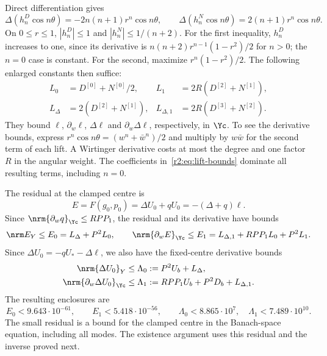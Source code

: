 Direct differentiation gives
\[
 \Delta(h_n^D\cos n\theta)=-2n(n+1)r^n\cos n\theta,
 \qquad
 \Delta(h_n^N\cos n\theta)=2(n+1)r^n\cos n\theta.
\]
On $0\le r\le1$, $|h_n^D|\le1$ and $|h_n^N|\le1/(n+2)$. For the first inequality, $h_n^D$ increases to one, since its derivative is $n(n+2)r^{n-1}(1-r^2)/2$ for $n>0$; the $n=0$ case is constant. For the second, maximize $r^n(1-r^2)/2$. The following enlarged constants then suffice:
\begin{equation}\label{r2:eq:lift-bounds}
 \begin{aligned}
 L_0&=D^{[0]}+N^{[0]}/2,&
 L_1&=2R(D^{[2]}+N^{[1]}),\\
 L_\Delta&=2(D^{[2]}+N^{[1]}),&
 L_{\Delta,1}&=2R(D^{[3]}+N^{[2]}).
 \end{aligned}
\end{equation}
They bound $\ell$, $\partial_w\ell$, $\Delta\ell$ and $\partial_w\Delta\ell$, respectively, in $\Yc$. To see the derivative bounds, express $r^n\cos n\theta=(w^n+\bar w^n)/2$ and multiply by $w\bar w$ for the second term of each lift. A Wirtinger derivative costs at most the degree and one factor $R$ in the angular weight. The coefficients in~\eqref{r2:eq:lift-bounds} dominate all resulting terms, including $n=0$.

The residual at the clamped centre is
\begin{equation}\label{r2:eq:E}
 E=F(g_0,p_0)=\Delta U_0+qU_0=-(\Delta+q)\ell.
\end{equation}
Since $\nrm{\partial_wq}_{\Yc}\le RPP_1$, the residual and its derivative have bounds
\begin{equation}\label{r2:eq:E-bounds}
 \nrm E_Y\le E_0=L_\Delta+P^2L_0,
 \qquad
 \nrm{\partial_wE}_{\Yc}\le E_1=L_{\Delta,1}+RPP_1L_0+P^2L_1.
\end{equation}
Since $\Delta U_0=-qU_*-\Delta\ell$, we also have the fixed-centre derivative bounds
\begin{equation}\label{r2:eq:D-bounds}
 \begin{split}
 \nrm{\Delta U_0}_Y&\le\Lambda_0:=P^2U_b+L_\Delta,\\
 \nrm{\partial_w\Delta U_0}_{\Yc}&\le
 \Lambda_1:=RPP_1U_b+P^2D_b+L_{\Delta,1}.
 \end{split}
\end{equation}
The resulting enclosures are
\begin{equation}\label{r2:eq:E-numbers}
 E_0<9.643\cdot10^{-61},\qquad E_1<5.418\cdot10^{-56},
 \qquad\Lambda_0<8.865\cdot10^7,\quad\Lambda_1<7.489\cdot10^{10}.
\end{equation}
The small residual is a bound for the clamped centre in the Banach-space equation, including all modes. The existence argument uses this residual and the inverse proved next.

